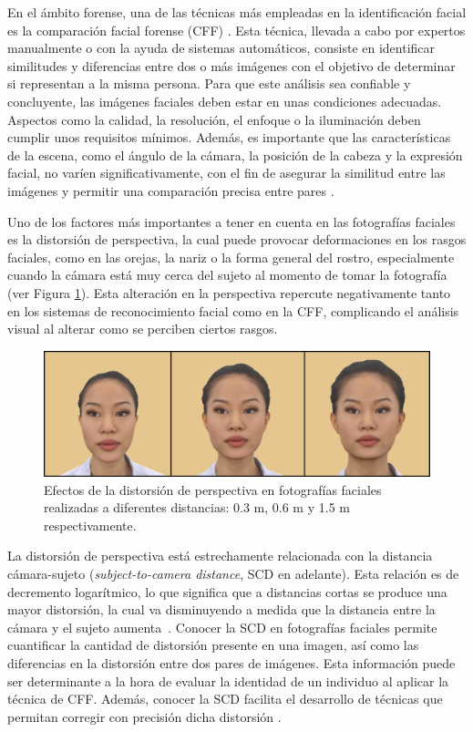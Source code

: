 En el ámbito forense, una de las técnicas más empleadas en la identificación facial es la comparación facial forense (CFF) \cite{3}. Esta técnica, llevada a cabo por expertos manualmente o con la ayuda de sistemas automáticos, consiste en identificar similitudes y diferencias entre dos o más imágenes con el objetivo de determinar si representan a la misma persona. 
Para que este análisis sea confiable y concluyente, las imágenes faciales deben estar en unas condiciones adecuadas. Aspectos como la calidad, la resolución, el enfoque o la iluminación deben cumplir unos requisitos mínimos. Además, es importante que las características de la escena, como el ángulo de la cámara, la posición de la cabeza y la expresión facial, no varíen significativamente, con el fin de asegurar la similitud entre las imágenes y permitir una comparación precisa entre pares \cite{1,2}.

Uno de los factores más importantes a tener en cuenta en las fotografías faciales es la distorsión de perspectiva, la cual puede provocar deformaciones en los rasgos faciales, como en las orejas, la nariz o la forma general del rostro, especialmente cuando la cámara está muy cerca del sujeto al momento de tomar la fotografía~\cite{12} (ver Figura \ref{fig2}). 
Esta alteración en la perspectiva repercute negativamente tanto en los sistemas de reconocimiento facial como en la CFF, complicando el análisis visual al alterar como se perciben ciertos rasgos.

\begin{figure}[h]
	\centering
	\includegraphics[scale=0.25]{imagenes/cap1/scd_distorsion.png}
	\caption[Efectos de la distorsión de perspectiva en fotografías faciales.]{Efectos de la distorsión de perspectiva en fotografías faciales realizadas a diferentes distancias: 0.3 m, 0.6 m y 1.5 m respectivamente.}
	\label{fig2}
\end{figure}

La distorsión de perspectiva está estrechamente relacionada con la distancia cámara-sujeto (\textit{subject-to-camera distance}, SCD en adelante). Esta relación es de decremento logarítmico, lo que significa que a distancias cortas se produce una mayor distorsión, la cual va disminuyendo a medida que la distancia entre la cámara y el sujeto aumenta~\cite{55}. Conocer la SCD en fotografías faciales permite cuantificar la cantidad de distorsión presente en una imagen, así como las diferencias en la distorsión entre dos pares de imágenes. Esta información puede ser determinante a la hora de evaluar la identidad de un individuo al aplicar la técnica de CFF. Además, conocer la SCD facilita el desarrollo de técnicas que permitan corregir con precisión dicha distorsión \cite{16}.

